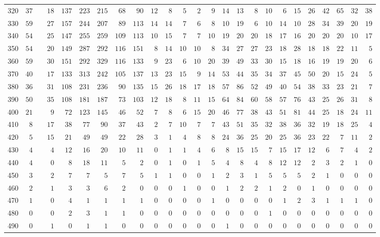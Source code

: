 \begin{sidewaystable}[!tbp]
\begin{center}
\begin{tabular}{lrcrrrrrrrrrrrrrrrrrrrrrr}
320&$37$&&$18$&$137$&$223$&$215$&$ 68$&$ 90$&$12$&$ 8$&$ 5$&$ 2$&$ 9$&$ 14$&$ 13$&$  8$&$ 10$&$  6$&$ 15$&$ 26$&$ 42$&$ 65$&$ 32$&$ 38$\tabularnewline
330&$59$&&$27$&$157$&$244$&$207$&$ 89$&$113$&$14$&$14$&$ 7$&$ 6$&$ 8$&$ 10$&$ 19$&$  6$&$ 10$&$ 14$&$ 10$&$ 28$&$ 34$&$ 39$&$ 20$&$ 19$\tabularnewline
340&$54$&&$25$&$147$&$255$&$259$&$109$&$113$&$10$&$15$&$ 7$&$ 7$&$10$&$ 19$&$ 20$&$ 20$&$ 18$&$ 17$&$ 16$&$ 20$&$ 20$&$ 20$&$ 10$&$ 17$\tabularnewline
350&$54$&&$20$&$149$&$287$&$292$&$116$&$151$&$ 8$&$14$&$10$&$10$&$ 8$&$ 34$&$ 27$&$ 27$&$ 23$&$ 18$&$ 28$&$ 18$&$ 18$&$ 22$&$ 11$&$  5$\tabularnewline
360&$59$&&$30$&$151$&$292$&$329$&$116$&$133$&$ 9$&$23$&$ 6$&$10$&$20$&$ 39$&$ 49$&$ 33$&$ 30$&$ 15$&$ 18$&$ 16$&$ 19$&$ 19$&$ 20$&$  6$\tabularnewline
370&$40$&&$17$&$133$&$313$&$242$&$105$&$137$&$13$&$23$&$15$&$ 9$&$14$&$ 53$&$ 44$&$ 35$&$ 34$&$ 37$&$ 45$&$ 50$&$ 20$&$ 15$&$ 24$&$  5$\tabularnewline
380&$36$&&$31$&$108$&$231$&$236$&$ 90$&$135$&$15$&$26$&$18$&$17$&$18$&$ 57$&$ 86$&$ 52$&$ 49$&$ 40$&$ 54$&$ 38$&$ 33$&$ 23$&$ 21$&$  7$\tabularnewline
390&$50$&&$35$&$108$&$181$&$187$&$ 73$&$103$&$12$&$18$&$ 8$&$11$&$15$&$ 64$&$ 84$&$ 60$&$ 58$&$ 57$&$ 76$&$ 43$&$ 25$&$ 26$&$ 31$&$  8$\tabularnewline
400&$21$&&$ 9$&$ 72$&$123$&$145$&$ 46$&$ 52$&$ 7$&$ 8$&$ 6$&$15$&$20$&$ 46$&$ 77$&$ 38$&$ 43$&$ 51$&$ 81$&$ 44$&$ 25$&$ 18$&$ 24$&$ 11$\tabularnewline
410&$ 8$&&$17$&$ 38$&$ 77$&$ 90$&$ 37$&$ 43$&$ 2$&$ 7$&$10$&$ 7$&$ 7$&$ 43$&$ 51$&$ 35$&$ 32$&$ 38$&$ 36$&$ 32$&$ 19$&$ 18$&$ 25$&$  4$\tabularnewline
420&$ 5$&&$15$&$ 21$&$ 49$&$ 49$&$ 22$&$ 28$&$ 3$&$ 1$&$ 4$&$ 8$&$ 8$&$ 24$&$ 36$&$ 25$&$ 20$&$ 25$&$ 36$&$ 23$&$ 22$&$  7$&$ 11$&$  2$\tabularnewline
430&$ 4$&&$ 4$&$ 12$&$ 16$&$ 20$&$ 10$&$ 11$&$ 0$&$ 1$&$ 1$&$ 4$&$ 6$&$  8$&$ 15$&$ 15$&$  7$&$ 15$&$ 17$&$ 12$&$  6$&$  7$&$  4$&$  2$\tabularnewline
440&$ 4$&&$ 0$&$  8$&$ 18$&$ 11$&$  5$&$  2$&$ 0$&$ 1$&$ 0$&$ 1$&$ 5$&$  4$&$  8$&$  4$&$  8$&$ 12$&$ 12$&$  2$&$  3$&$  2$&$  1$&$  0$\tabularnewline
450&$ 3$&&$ 2$&$  7$&$  7$&$  5$&$  7$&$  5$&$ 1$&$ 1$&$ 0$&$ 0$&$ 1$&$  2$&$  3$&$  1$&$  5$&$  5$&$  5$&$  2$&$  1$&$  0$&$  0$&$  0$\tabularnewline
460&$ 2$&&$ 1$&$  3$&$  3$&$  6$&$  2$&$  0$&$ 0$&$ 0$&$ 1$&$ 0$&$ 0$&$  1$&$  2$&$  2$&$  1$&$  2$&$  0$&$  1$&$  0$&$  0$&$  0$&$  0$\tabularnewline
470&$ 1$&&$ 0$&$  4$&$  1$&$  1$&$  1$&$  1$&$ 0$&$ 0$&$ 0$&$ 0$&$ 1$&$  0$&$  0$&$  0$&$  0$&$  1$&$  2$&$  3$&$  1$&$  1$&$  1$&$  0$\tabularnewline
480&$ 0$&&$ 0$&$  2$&$  3$&$  1$&$  1$&$  0$&$ 0$&$ 0$&$ 0$&$ 0$&$ 0$&$  0$&$  0$&$  0$&$  1$&$  0$&$  0$&$  0$&$  0$&$  0$&$  0$&$  0$\tabularnewline
490&$ 0$&&$ 1$&$  0$&$  1$&$  1$&$  0$&$  0$&$ 0$&$ 0$&$ 0$&$ 0$&$ 0$&$  1$&$  0$&$  0$&$  0$&$  0$&$  0$&$  0$&$  0$&$  0$&$  0$&$  0$\tabularnewline
\hline
\end{tabular}
\end{center}
\end{sidewaystable}

